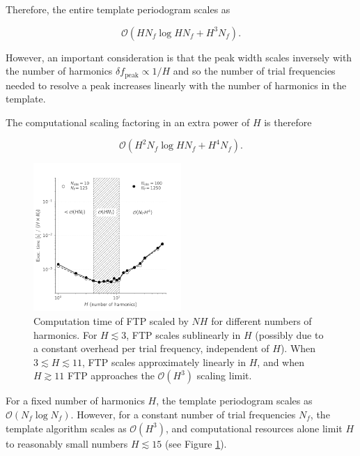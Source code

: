 \documentclass[apj]{emulateapj}
\newcommand{\bigO}{\mathcal{O}}
\begin{document}
Therefore, the entire template periodogram scales as

\begin{equation}
\bigO(HN_f \log HN_f + H^3N_f).
\end{equation}

However, an important consideration is that the peak width scales inversely with the number of harmonics $\delta f_{\mathrm{peak}} \propto 1/H$ and so the number of trial frequencies needed to resolve a peak increases linearly with the number of harmonics in the template.

The computational scaling factoring in an extra power of $H$ is therefore

\begin{equation}
\bigO(H^2N_f \log HN_f + H^4N_f).
\end{equation}


\begin{figure}
    \centering
    \includegraphics[width=0.5\textwidth]{plots/timing_vs_nharm.pdf}
    \caption{\label{fig:timingnharm} Computation time of FTP scaled by $NH$ for
            different numbers of harmonics. For $H\lesssim 3$, FTP scales
            sublinearly in $H$ (possibly due to a constant overhead per
            trial frequency, independent of $H$). When $3 \lesssim H \lesssim 11$,
            FTP scales approximately linearly in $H$, and when $H \gtrsim 11$
            FTP approaches the $\bigO(H^3)$ scaling limit.}
\end{figure}

For a fixed number of harmonics $H$, the template periodogram scales as
$\bigO(N_f\log N_f)$. However, for a constant number of trial frequencies $N_f$,
the template algorithm scales as $\bigO(H^3)$, and computational resources
alone limit $H$ to reasonably small numbers $H\lesssim15$ (see Figure \ref{fig:timingnharm}).


\end{document}
